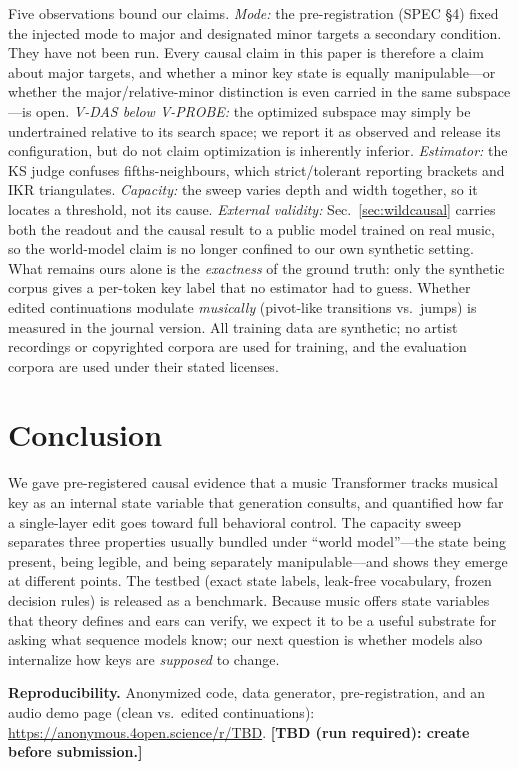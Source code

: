 \documentclass[conference]{IEEEtran}
\makeatletter
\newcommand{\ikr}{\mathrm{IKR}}
\newcommand{\TBD}[1]{\textbf{[TBD (run required): #1]}}
\newcommand{\vs}{vs.\@\ }
\makeatother
\begin{document}
Five observations bound our claims. \emph{Mode:} the pre-registration (SPEC §4) fixed
the injected mode to major and designated minor targets a secondary condition. They have
not been run. Every causal claim in this paper is therefore a claim about major targets,
and whether a minor key state is equally manipulable---or whether the major/relative-minor
distinction is even carried in the same subspace---is open. \emph{V-DAS below V-PROBE:}
the optimized subspace may simply be undertrained relative to its search space; we report
it as observed and release its configuration, but do not claim optimization is inherently
inferior. \emph{Estimator:} the KS judge confuses fifths-neighbours, which
strict/tolerant reporting brackets and $\ikr$ triangulates. \emph{Capacity:} the sweep
varies depth and width together, so it locates a threshold, not its cause. \emph{External
validity:} Sec.~\ref{sec:wildcausal} carries both the readout and the causal result to a
public model trained on real music, so the world-model claim is no longer confined to our
own synthetic setting. What remains ours alone is the \emph{exactness} of the ground
truth: only the synthetic corpus gives a per-token key label that no estimator had to
guess. Whether edited continuations modulate
\emph{musically} (pivot-like transitions \vs jumps) is measured in the journal version.
All training data are synthetic; no artist recordings or copyrighted corpora are used
for training, and the evaluation corpora are used under their stated licenses.

\section{Conclusion}
\label{sec:concl}
We gave pre-registered causal evidence that a music Transformer tracks musical key as
an internal state variable that generation consults, and quantified how far a
single-layer edit goes toward full behavioral control. The capacity sweep separates
three properties usually bundled under ``world model''---the state being present,
being legible, and being separately manipulable---and shows they emerge at different
points. The testbed (exact state labels, leak-free vocabulary, frozen decision rules)
is released as a benchmark. Because music offers state variables that theory defines
and ears can verify, we expect it to be a useful substrate for asking what sequence
models know; our next question is whether models also internalize how keys are
\emph{supposed} to change.

\vspace{2pt}\noindent\footnotesize\textbf{Reproducibility.} Anonymized code, data
generator, pre-registration, and an audio demo page (clean \vs edited continuations):
\url{https://anonymous.4open.science/r/TBD}. \TBD{create before submission.}\normalsize
\end{document}
